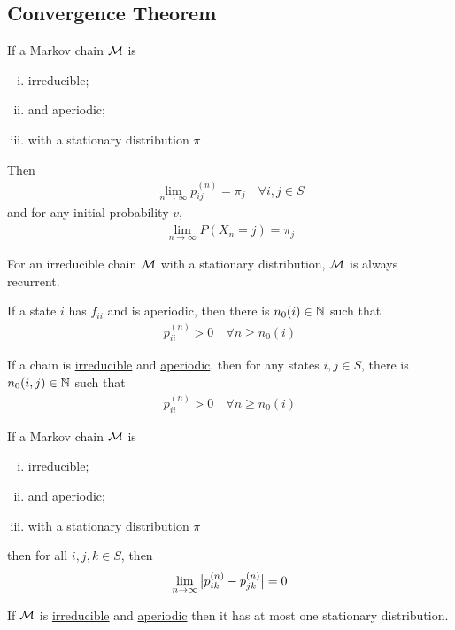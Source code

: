 \documentclass{article}
\newcommand{\upn}[0]{^{(n)}}
\begin{document}
	\subsection{Convergence Theorem}
	
	\begin{theorem}
		If a Markov chain $\mathcal{{M}}$ is 
		\begin{enumerate}[(i)]
			\item irreducible;
			\item and aperiodic;
			\item with a stationary distribution $\pi$
		\end{enumerate}
		Then 
		\begin{align}
			\lim_{n \to \infty} p_{ij}\upn = \pi_j\quad\forall i, j \in S
		\end{align}
		and for any initial probability $v$,
		\begin{align}
			\lim_{n \to \infty} P(X_n = j) = \pi_j
		\end{align}
	\end{theorem}
	
	\begin{theorem}
		For an irreducible chain $\mathcal{{M}}$ with a stationary distribution, $\mathcal{{M}}$ is always recurrent.
	\end{theorem}
	
	\begin{proposition}
		If a state $i$ has $f_{ii}$ and is aperiodic, then there is $n_0(i) \in \mathbb{N}$ such that
		\begin{align}
			p_{ii}\upn > 0\quad \forall n \geq n_0(i)
		\end{align}
	\end{proposition}

	\begin{corollary}
		If a chain is \ul{irreducible} and \ul{aperiodic}, then for any states $i, j \in S$, there is $n_0(i, j) \in \mathbb{N}$ such that
		\begin{align}
			p_{ii}\upn > 0\quad \forall n \geq n_0(i)
		\end{align}
	\end{corollary}
	
	\begin{lemma}
		If a Markov chain $\mathcal{{M}}$ is
		\begin{enumerate}[(i)]
			\item irreducible;
			\item and aperiodic;
			\item with a stationary distribution $\pi$
		\end{enumerate}
		then for all $i, j, k \in S$, then
		\begin{align}
			\lim_{n \to \infty} \abs{
				p_{ik}\upn - p_{jk}\upn
			} = 0
		\end{align}
	\end{lemma}
	
	\begin{corollary}
		If $\mathcal{{M}}$ is \ul{irreducible} and \ul{aperiodic} then it has at most one stationary distribution.
	\end{corollary}
\end{document}
